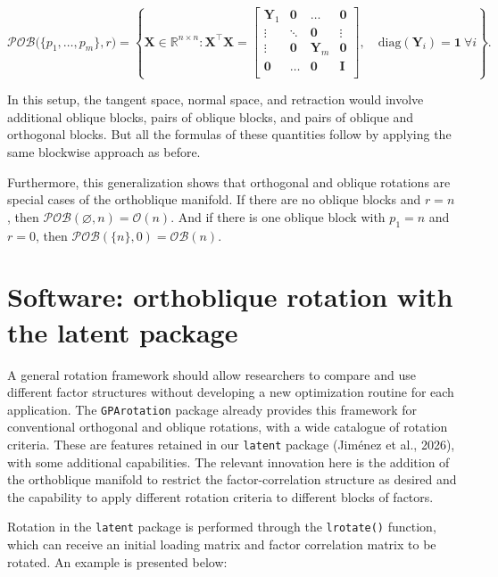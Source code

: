 \documentclass[
  12pt,
  letterpaper,
  article]{scrartcl}
\begin{document}
\[
\mathcal{POB}\big(\{p_1,\ldots,p_m\},r\big) = \left\{\mathbf{X} \in \mathbb{R}^{n \times n}: \mathbf{X}^\top\mathbf{X} = \begin{bmatrix}
\mathbf{Y}_1 & \mathbf{0} & \dots  & \mathbf{0} \\
\vdots & \ddots & \mathbf{0} & \vdots \\
\vdots & \mathbf{0} & \mathbf{Y}_m & \mathbf{0} \\
\mathbf{0} & \dots & \mathbf{0} & \mathbf{I} \\
\end{bmatrix}, \quad \text{diag}(\mathbf{Y}_i) = \mathbf{1} \ \forall i
\right\}.
\]

In this setup, the tangent space, normal space, and retraction would
involve additional oblique blocks, pairs of oblique blocks, and pairs of
oblique and orthogonal blocks. But all the formulas of these quantities
follow by applying the same blockwise approach as before.

Furthermore, this generalization shows that orthogonal and oblique
rotations are special cases of the orthoblique manifold. If there are no
oblique blocks and \(r=n\), then
\(\mathcal{POB}(\varnothing,n)=\mathcal{O}(n)\). And if there is one
oblique block with \(p_1=n\) and \(r=0\), then
\(\mathcal{POB}(\{n\},0)=\mathcal{OB}(n)\).

\section{Software: orthoblique rotation with the latent
package}\label{software-orthoblique-rotation-with-the-latent-package}

A general rotation framework should allow researchers to compare and use
different factor structures without developing a new optimization
routine for each application. The \texttt{GPArotation} package already
provides this framework for conventional orthogonal and oblique
rotations, with a wide catalogue of rotation criteria. These are
features retained in our \texttt{latent} package (Jiménez et al., 2026),
with some additional capabilities. The relevant innovation here is the
addition of the orthoblique manifold to restrict the factor-correlation
structure as desired and the capability to apply different rotation
criteria to different blocks of factors.

Rotation in the \texttt{latent} package is performed through the
\texttt{lrotate()} function, which can receive an initial loading matrix
and factor correlation matrix to be rotated. An example is presented
below:
\end{document}
